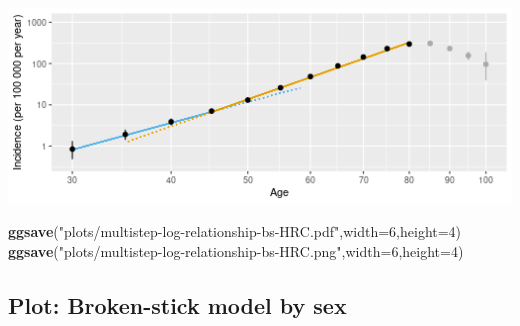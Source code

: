 \documentclass[
]{article}
\newenvironment{Shaded}{\begin{snugshade}}{\end{snugshade}}
\newcommand{\DataTypeTok}[1]{\textcolor[rgb]{0.13,0.29,0.53}{#1}}
\newcommand{\DecValTok}[1]{\textcolor[rgb]{0.00,0.00,0.81}{#1}}
\newcommand{\KeywordTok}[1]{\textcolor[rgb]{0.13,0.29,0.53}{\textbf{#1}}}
\newcommand{\NormalTok}[1]{#1}
\newcommand{\StringTok}[1]{\textcolor[rgb]{0.31,0.60,0.02}{#1}}
\begin{document}
\includegraphics{multistep-model-comparison_files/figure-latex/hrc-broken-stick-figure-1.png}

\begin{Shaded}
\begin{Highlighting}[]
\KeywordTok{ggsave}\NormalTok{(}\StringTok{"plots/multistep-log-relationship-bs-HRC.pdf"}\NormalTok{,}\DataTypeTok{width=}\DecValTok{6}\NormalTok{,}\DataTypeTok{height=}\DecValTok{4}\NormalTok{)}
\KeywordTok{ggsave}\NormalTok{(}\StringTok{"plots/multistep-log-relationship-bs-HRC.png"}\NormalTok{,}\DataTypeTok{width=}\DecValTok{6}\NormalTok{,}\DataTypeTok{height=}\DecValTok{4}\NormalTok{)}
\end{Highlighting}
\end{Shaded}

\hypertarget{plot-broken-stick-model-by-sex}{%
\subsection{Plot: Broken-stick model by
sex}\label{plot-broken-stick-model-by-sex}}
\end{document}
